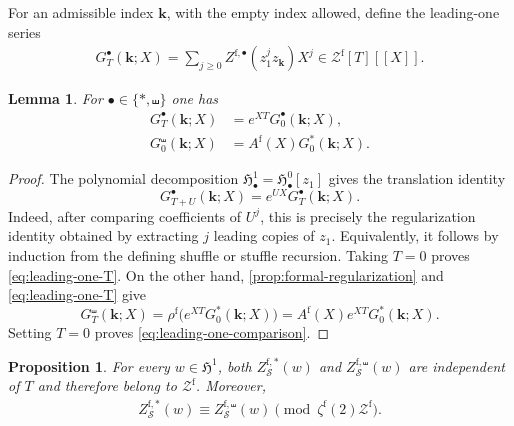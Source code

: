 \documentclass[12pt]{amsart}
\numberwithin{equation}{section}
\theoremstyle{plain}
\newtheorem{lem}[lem]{Lemma}
\newtheorem{prop}[prop]{Proposition}
\newcommand{\h}{\mathfrak H}
\newcommand{\Zf}{{\mathcal Z^{\mathrm f}}}
\newcommand{\zf}[1]{\zeta^{\mathrm f}(#1)}
\begin{document}
For an admissible index $\boldsymbol{k}$, with the empty index allowed, define the leading-one series
\begin{align}\label{eq:leading-one-series}
 G_T^\bullet(\boldsymbol{k};X)
 =\sum_{j\geq0}Z^{\mathrm f,\bullet}(z_1^jz_{\boldsymbol{k}})X^j
 \in\Zf[T][[X]].
\end{align}

\begin{lem}\label{lem:leading-one}
For $\bullet\in\{*,\shuffle\}$ one has
\begin{align}
 G_T^\bullet(\boldsymbol{k};X)
 &=e^{XT}G_0^\bullet(\boldsymbol{k};X),\label{eq:leading-one-T}\\
 G_0^\shuffle(\boldsymbol{k};X)
 &=A^{\mathrm f}(X)G_0^*(\boldsymbol{k};X).\label{eq:leading-one-comparison}
\end{align}
\end{lem}

\begin{proof}
The polynomial decomposition $\h^1_\bullet=\h^0_\bullet[z_1]$ gives the translation identity
\[
 G_{T+U}^\bullet(\boldsymbol{k};X)
 =e^{UX}G_T^\bullet(\boldsymbol{k};X).
\]
Indeed, after comparing coefficients of $U^j$, this is precisely the regularization identity obtained by extracting $j$ leading copies of $z_1$. Equivalently, it follows by induction from the defining shuffle or stuffle recursion. Taking $T=0$ proves \eqref{eq:leading-one-T}. On the other hand, \cref{prop:formal-regularization} and \eqref{eq:leading-one-T} give
\[
 G_T^\shuffle(\boldsymbol{k};X)
 =\rho^{\mathrm f}\bigl(e^{XT}G_0^*(\boldsymbol{k};X)\bigr)
 =A^{\mathrm f}(X)e^{XT}G_0^*(\boldsymbol{k};X).
\]
Setting $T=0$ proves \eqref{eq:leading-one-comparison}.
\end{proof}

\begin{prop}\label{prop:formal-symmetric-regularization}
For every $w\in\h^1$, both $Z_{\mathcal S}^{\mathrm f,*}(w)$ and
$Z_{\mathcal S}^{\mathrm f,\shuffle}(w)$ are independent of $T$ and therefore belong to $\Zf$. Moreover,
\begin{align}\label{eq:formal-reg-congruence}
 Z_{\mathcal S}^{\mathrm f,*}(w)
 \equiv Z_{\mathcal S}^{\mathrm f,\shuffle}(w)
 \pmod{\zf{2}\Zf}.
\end{align}
\end{prop}
\end{document}
